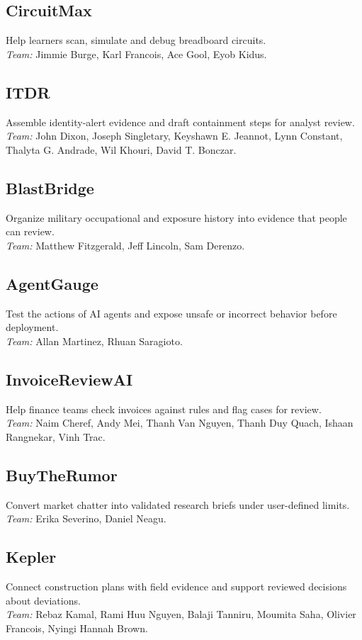 \documentclass[sigconf,nonacm]{acmart}
\begin{document}
\subsection*{CircuitMax}
Help learners scan, simulate and debug breadboard circuits.\\
\textit{Team:} Jimmie Burge, Karl Francois, Ace Gool, Eyob Kidus.

\subsection*{ITDR}
Assemble identity-alert evidence and draft containment steps for analyst review.\\
\textit{Team:} John Dixon, Joseph Singletary, Keyshawn E. Jeannot, Lynn Constant, Thalyta G. Andrade, Wil Khouri, David T. Bonczar.

\subsection*{BlastBridge}
Organize military occupational and exposure history into evidence that people can review.\\
\textit{Team:} Matthew Fitzgerald, Jeff Lincoln, Sam Derenzo.

\subsection*{AgentGauge}
Test the actions of AI agents and expose unsafe or incorrect behavior before deployment.\\
\textit{Team:} Allan Martinez, Rhuan Saragioto.

\subsection*{InvoiceReviewAI}
Help finance teams check invoices against rules and flag cases for review.\\
\textit{Team:} Naim Cheref, Andy Mei, Thanh Van Nguyen, Thanh Duy Quach, Ishaan Rangnekar, Vinh Trac.

\subsection*{BuyTheRumor}
Convert market chatter into validated research briefs under user-defined limits.\\
\textit{Team:} Erika Severino, Daniel Neagu.

\subsection*{Kepler}
Connect construction plans with field evidence and support reviewed decisions about deviations.\\
\textit{Team:} Rebaz Kamal, Rami Huu Nguyen, Balaji Tanniru, Moumita Saha, Olivier Francois, Nyingi Hannah Brown.
\end{document}
